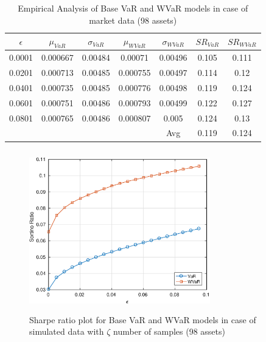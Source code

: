 \documentclass[12pt]{article}
\numberwithin{equation}{section}
\begin{document}
\begin{table}[!h]
\centering
\captionsetup{justification=centering}
\begin{tabular}{||c|c|c|c|c|c|c||}
\hline
$\epsilon$ & $\mu_{VaR}$ & $\sigma_{VaR}$ & $\mu_{WVaR}$ & $\sigma_{WVaR}$ & $SR_{VaR}$ & $SR_{WVaR}$\\
\hline
0.0001 & 0.000667 & 0.00484 & 0.00071 & 0.00496 & 0.105 & 0.111 \\ 
0.0201 & 0.000713 & 0.00485 & 0.000755 & 0.00497 & 0.114 & 0.12 \\
0.0401 & 0.000735 & 0.00485 & 0.000776 & 0.00498 & 0.119 & 0.124 \\
0.0601 & 0.000751 & 0.00486 & 0.000793 & 0.00499 & 0.122 & 0.127 \\
0.0801 & 0.000765 & 0.00486 & 0.000807 & 0.005 & 0.124 & 0.13 \\
\hline
& & & & Avg & 0.119 & 0.124 \\
\hline
\end{tabular}
\caption{Empirical Analysis of Base VaR and WVaR models in case of market data (98 assets)}
\label{tab:5.4}
\end{table}

\begin{figure}[!h]
\centering
\includegraphics[height=7.0cm,width=0.7\textwidth]{VaR/bse100_simulated/sr_exact_cheb.eps}
\caption{Sharpe ratio plot for Base VaR and WVaR models in case of simulated data with $\zeta$ number of samples (98 assets)}
\label{fig:5.5}
\end{figure}
\end{document}
